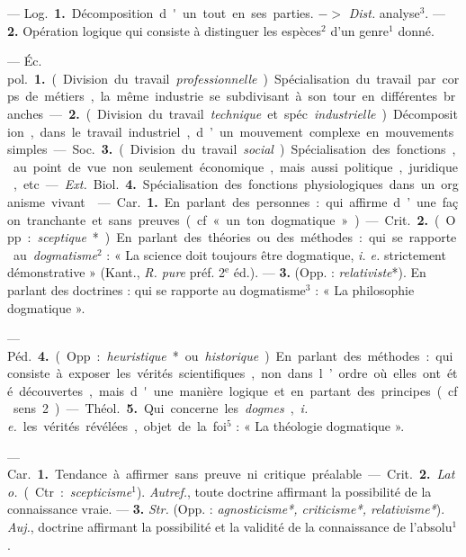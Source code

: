 \begin{itemize}[leftmargin=1cm, label=, itemsep=1pt]
 — \si{Log.} {\bf 1.} Décomposition
d'un tout en ses parties. $->$ {\it Dist.}
analyse$^3$. — {\bf 2.} Opération logique
qui consiste à distinguer les espèces$^2$
d'un genre$^1$ donné.

 — \si{Éc. pol.} {\bf 1.} (Division du travail
{\it professionnelle}). Spécialisation du travail par corps de
métiers, la même industrie se subdivisant à son tour en différentes
branches. — {\bf 2.} (Division du travail
{\it technique} et spéc. {\it industrielle}.) Décomposition, dans le travail industriel, d’un mouvement complexe en
mouvements simples.

— \si{Soc.} {\bf 3.} (Division du travail
{\it social}.) Spécialisation des fonctions,
au point de vue non seulement
économique, mais aussi politique,
juridique, etc.

— {\it Ext.} \si{Biol.} {\bf 4.} Spécialisation
des fonctions physiologiques dans un
organisme vivant.

 — \si{Car.} {\bf 1.} En parlant
des personnes : qui affirme d’une
façon tranchante et sans preuves
(cf. « un ton dogmatique »).

— \si{Crit.} {\bf 2.} (Opp. : {\it sceptique}*). En
parlant des théories ou des méthodes : qui se rapporte au {\it dogmatisme}$^2$ : « La science doit toujours
être dogmatique, {\it i. e.} strictement
démonstrative » (Kant., {\it R. pure}
préf. 2$^\text{e}$ éd.). — {\bf 3.} (Opp. : {\it relativiste}*). En parlant des doctrines :
qui se rapporte au dogmatisme$^3$ :
« La philosophie dogmatique ».

— \si{Péd.} {\bf 4.} (Opp. : {\it heuristique}* ou
{\it historique}). En parlant des méthodes : qui consiste à exposer les vérités scientifiques, non dans l’ordre
où elles ont été découvertes, mais
d'une manière logique et en partant des principes (cf. sens 2).

— \si{Théol.} {\bf 5.} Qui concerne les
{\it dogmes}, {\it i. e.} les vérités révélées,
objet de la foi$^5$ : « La théologie dogmatique ».

 — \si{Car.} {\bf 1.} Tendance à
affirmer sans preuve ni critique
préalable.

— \si{Crit.} {\bf 2.} {\it Lato.} (Ctr. : {\it scepticisme}$^1$). {\it Autref.}, toute doctrine affirmant la possibilité de la connaissance vraie. — {\bf 3.} {\it Str.} (Opp. : {\it agnosticisme*, criticisme*, relativisme*}).
{\it Auj.}, doctrine affirmant la possibilité et la validité
de la connaissance de l’absolu$^1$.


\end{itemize}
